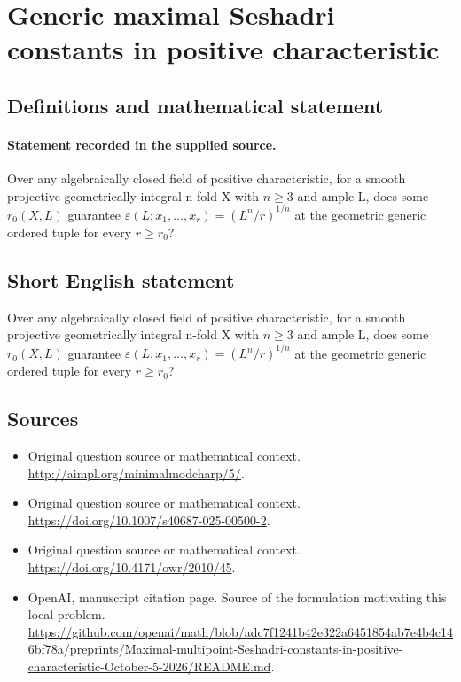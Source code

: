 \documentclass[11pt]{article}
\begin{document}
\section*{Generic maximal Seshadri constants in positive characteristic}\label{30007045}
\subsection{Definitions and mathematical statement}
\paragraph{Statement recorded in the supplied source.}
Over any algebraically closed field of positive characteristic, for a smooth projective geometrically integral n-fold X with $n\geq 3$ and ample L, does some $r_{0}(X,L)$ guarantee $\varepsilon (L;x_{1},\dots ,x_r)=(L^n/r)^{1/n}$ at the geometric generic ordered tuple for every $r\geq r_{0}$?
\subsection{Short English statement}
Over any algebraically closed field of positive characteristic, for a smooth projective geometrically integral n-fold X with $n\geq 3$ and ample L, does some $r_{0}(X,L)$ guarantee $\varepsilon (L;x_{1},\dots ,x_r)=(L^n/r)^{1/n}$ at the geometric generic ordered tuple for every $r\geq r_{0}$?
\subsection{Sources}
\begin{itemize}
\item[S1] Original question source or mathematical context.
\url{http://aimpl.org/minimalmodcharp/5/}.
\item[S2] Original question source or mathematical context.
\url{https://doi.org/10.1007/s40687-025-00500-2}.
\item[S3] Original question source or mathematical context.
\url{https://doi.org/10.4171/owr/2010/45}.
\item[S4] OpenAI, manuscript citation page. Source of the formulation motivating this local problem.
\url{https://github.com/openai/math/blob/adc7f1241b42e322a6451854ab7e4b4c146bf78a/preprints/Maximal-multipoint-Seshadri-constants-in-positive-characteristic-October-5-2026/README.md}.
\end{itemize}
\end{document}
